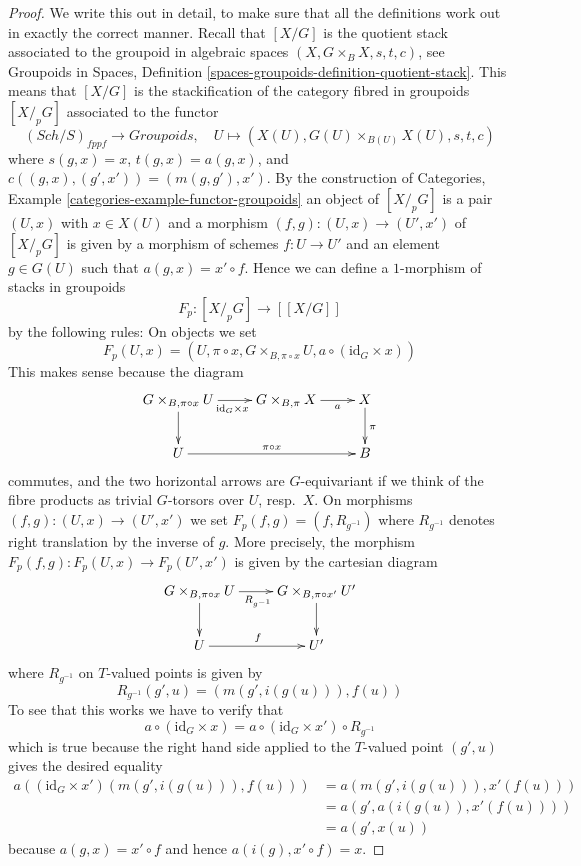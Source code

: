 \documentclass{stacks-project}
\theoremstyle{plain}
\theoremstyle{definition}
\theoremstyle{remark}
\numberwithin{equation}{subsection}
\def\Sch{\mathit{Sch}}
\begin{document}
\begin{proof}
We write this out in detail, to make sure that all the definitions
work out in exactly the correct manner.
Recall that $[X/G]$ is the quotient stack
associated to the groupoid in algebraic spaces
$(X, G \times_B X, s, t, c)$, see
Groupoids in Spaces,
Definition \ref{spaces-groupoids-definition-quotient-stack}.
This means that $[X/G]$ is the stackification of the
category fibred in groupoids $[X/_{\!p}G]$ associated to the functor
$$
(\Sch/S)_{fppf} \longrightarrow \textit{Groupoids},
\quad
U \longmapsto (X(U), G(U) \times_{B(U)} X(U), s, t, c)
$$
where $s(g, x) = x$, $t(g, x) = a(g, x)$, and
$c((g, x), (g', x')) = (m(g, g'), x')$. By the construction of
Categories, Example \ref{categories-example-functor-groupoids}
an object of $[X/_{\!p}G]$ is a pair $(U, x)$ with $x \in X(U)$
and a morphism $(f, g) : (U, x) \to (U', x')$ of $[X/_{\!p}G]$
is given by a morphism of schemes $f : U \to U'$ and an element
$g \in G(U)$ such that $a(g, x) = x' \circ f$.
Hence we can define a $1$-morphism of stacks in groupoids
$$
F_p : [X/_{\!p}G] \longrightarrow [[X/G]]
$$
by the following rules: On objects we set
$$
F_p(U, x) =
(U, \pi \circ x, G \times_{B, \pi \circ x} U, a \circ (\text{id}_G \times x))
$$
This makes sense because the diagram
$$
\xymatrix{
G \times_{B, \pi \circ x} U \ar[d] \ar[r]_{\text{id}_G \times x} &
G \times_{B, \pi} X \ar[r]_-a &
X \ar[d]^\pi \\
U \ar[rr]^{\pi \circ x} & & B
}
$$
commutes, and the two horizontal arrows are $G$-equivariant if we think
of the fibre products as trivial $G$-torsors over $U$, resp.\ $X$.
On morphisms $(f, g) : (U, x) \to (U', x')$ we set
$F_p(f, g) = (f, R_{g^{-1}})$ where $R_{g^{-1}}$ denotes right translation
by the inverse of $g$. More precisely, the morphism
$F_p(f, g) : F_p(U, x) \to F_p(U', x')$ is given by the cartesian diagram
$$
\xymatrix{
G \times_{B, \pi \circ x} U \ar[d] \ar[r]_{R_{g^{-1}}} &
G \times_{B, \pi \circ x'} U' \ar[d] \\
U \ar[r]^f & U'
}
$$
where $R_{g^{-1}}$ on $T$-valued points is given by
$$
R_{g^{-1}}(g', u) = (m(g', i(g(u))), f(u))
$$
To see that this works we have to verify that
$$
a \circ (\text{id}_G \times x)
=
a \circ (\text{id}_G \times x') \circ R_{g^{-1}}
$$
which is true because the right hand side applied to the $T$-valued point
$(g', u)$ gives the desired equality
\begin{align*}
a((\text{id}_G \times x')(m(g', i(g(u))), f(u)))
& =
a(m(g', i(g(u))), x'(f(u))) \\
& =
a(g', a(i(g(u)), x'(f(u)))) \\
& =
a(g', x(u))
\end{align*}
because $a(g, x) = x' \circ f$ and hence $a(i(g), x' \circ f) = x$.


\end{proof}
\end{document}
